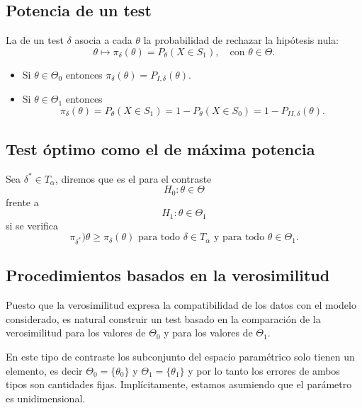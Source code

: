 \subsection{Potencia de un test}
\begin{tcolorbox}[colback=blue!5!white, colframe=blue!75!black, title=\textbf{Definición}]
La   de un test $\delta$ asocia a cada  $\theta$ la probabilidad de rechazar la hipótesis nula:  \[
\theta\mapsto \pi_\delta(\theta)=P_\theta(X \in S_1),\quad \text{con $\theta\in \Theta$}.
\] 
\end{tcolorbox}
\begin{tcolorbox}[colback=olive!5!white, colframe=olive!75!black, title=\textbf{Relación de la potencia con los errores}]
\begin{itemize}[label=\textbullet]
    \item Si $\theta\in \Theta_0$ entonces $\pi_\delta(\theta)=P_{I,\delta}(\theta)$.
    \item Si $\theta\in \Theta_1$ entonces \[
    \pi_\delta(\theta)=P_\theta(X\in S_1)=1-P_\theta(X\in S_0)=1-P_{II,\delta}(\theta).
    \] 
\end{itemize}
\end{tcolorbox}
\subsection{Test óptimo como el de máxima potencia}

Sea $\delta^*\in T_\alpha$, diremos que es el  para el contraste \[
H_0:\theta\in \Theta
\] frente a \[
H_1:\theta\in \Theta_1
\] si se verifica \[
\pi_{\delta^*})\theta\ge \pi_{\delta}(\theta)\text{ para todo $\delta\in T_\alpha$ y para todo $\theta\in \Theta_1$.}
\] 
\subsection{Procedimientos basados en la verosimilitud}
\begin{tcolorbox}[colback=olive!5!white, colframe=olive!75!black, title=\textbf{Un procedimiento natural}]
Puesto que la verosimilitud expresa la compatibilidad de los datos con el modelo considerado, es natural construir un test basado en la comparación de la verosimilitud para los valores de $\Theta_0$ y para los valores de $\Theta_1$.
\end{tcolorbox}
\begin{tcolorbox}[colback=olive!5!white, colframe=olive!75!black, title=\textbf{Constrastes de hipótesis simples}]
En este tipo de contraste los subconjunto del espacio paramétrico solo tienen un elemento, es decir $\Theta_0=\{\theta_0\} $ y $\Theta_1=\{\theta_1\} $ y por lo tanto los errores de ambos tipos son cantidades fijas. Implícitamente, estamos asumiendo que el parámetro es unidimensional.
\end{tcolorbox}
